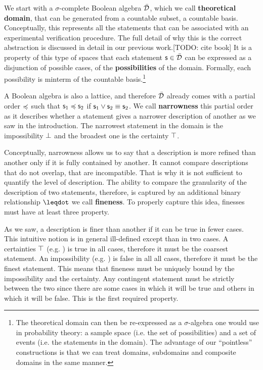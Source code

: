 \documentclass{article}
\begin{document}
We start with a $\sigma$-complete Boolean algebra $\bar{\mathcal{D}}$, which we call \textbf{theoretical domain}, that can be generated from a countable subset, a countable basis. Conceptually, this represents all the statements that can be associated with an experimental verification procedure. The full detail of why this is the correct abstraction is discussed in detail in our previous work.[TODO: cite book] It is a property of this type of spaces that each statement $\mathsf{s} \in \bar{\mathcal{D}}$ can be expressed as a disjunction of possible cases, of the  \textbf{possibilities} of the domain. Formally, each possibility is minterm of the countable basis.\footnote{The theoretical domain can then be re-expressed as a $\sigma$-algebra one would use in probability theory: a sample space (i.e. the set of possibilities) and a set of events (i.e. the statements in the domain). The advantage of our ``pointless'' constructions is that we can treat domains, subdomains and composite domains in the same manner.}

A Boolean algebra is also a lattice, and therefore $\bar{\mathcal{D}}$ already comes with a partial order $\preccurlyeq$ such that $\mathsf{s}_1 \preccurlyeq \mathsf{s}_2$ if $\mathsf{s}_1 \vee \mathsf{s}_2 \equiv \mathsf{s}_2$. We call \textbf{narrowness} this partial order as it describes whether a statement gives a narrower description of another as we saw in the introduction. The narrowest statement in the domain is the impossibility $\bot$ and the broadest one is the certainty $\top$.

Conceptually, narrowness allows us to say that a description is more refined than another only if it is fully contained by another. It cannot compare descriptions that do not overlap, that are incompatible. That is why it is not sufficient to quantify the level of description. The ability to compare the granularity of the description of two statements, therefore, is captured by an additional binary relationship $\finer$ we call \textbf{fineness}. To properly capture this idea, finesses must have at least three property.

As we saw, a description is finer than another if it can be true in fewer cases. This intuitive notion is in general ill-defined except than in two cases. A certainties $\top$ (e.g. ) is true in all cases, therefore it must be the coarsest statement. An impossibility (e.g. ) is false in all all cases, therefore it must be the finest statement. This means that fineness must be uniquely bound by the impossibility and the certainty. Any contingent statement must be strictly between the two since there are some cases in which it will be true and others in which it will be false. This is the first required property.
\end{document}
